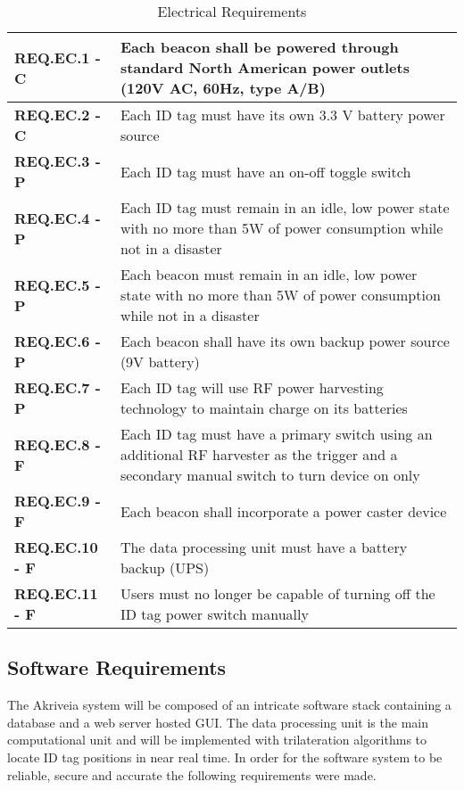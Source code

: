 \bgroup
\def\arraystretch{1.5}
\begin{table}[H]
\centering
\begin{tabular}{ | m{3.25cm} | m{12.5cm} |}
 \hline
 \textbf{REQ.EC.1 - C} & Each beacon shall be powered through standard North American power outlets (120V AC, 60Hz, type A/B) \\
\hline
 \textbf{REQ.EC.2 - C} & Each ID tag must have its own 3.3 V battery power source \\
\hline
 \textbf{REQ.EC.3 - P} & Each ID tag must have an on-off toggle switch  \\
\hline
 \textbf{REQ.EC.4 - P} &  Each ID tag must remain in an idle, low power state with no more than 5W of power consumption while not in a disaster  \\
\hline
 \textbf{REQ.EC.5 - P} &  Each beacon must remain in an idle, low power state with no more than 5W of power consumption while not in a disaster \\
\hline
 \textbf{REQ.EC.6 - P} & Each beacon shall have its own backup power source (9V battery)  \\
\hline
 \textbf{REQ.EC.7 - P} & Each ID tag will use RF power harvesting technology to maintain charge on its batteries \\
\hline
 \textbf{REQ.EC.8 - F} &  Each ID tag must have a primary switch using an additional RF harvester as the trigger and a secondary manual switch to turn device on only   \\
\hline
 \textbf{REQ.EC.9 - F} & Each beacon shall incorporate a power caster device \\
\hline
 \textbf{REQ.EC.10 - F} & The data processing unit must have a battery backup (UPS) \\
\hline
 \textbf{REQ.EC.11 - F} & Users must no longer be capable of turning off the ID tag power switch manually \\
\hline
\end{tabular}
\caption{Electrical Requirements}
\end{table}

\break
\subsection{Software Requirements}
\medskip
The Akriveia system will be composed of an intricate software stack containing a database and a web server hosted GUI. The data processing unit is the main computational unit and will be implemented with trilateration algorithms to locate ID tag positions in near real time. In order for the software system to be reliable, secure and accurate the following requirements were made.

